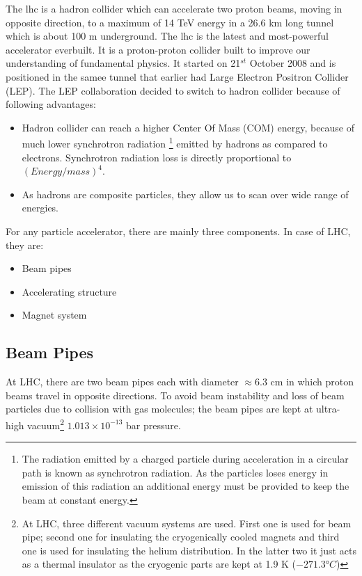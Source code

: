 The \acrshort{lhc} is  a hadron collider which can accelerate two proton beams, moving in opposite direction, to a maximum of 14 TeV energy in a 26.6 km long tunnel which is about 100 m underground. The \acrshort{lhc} is the latest and most-powerful accelerator everbuilt. It is a proton-proton collider built to improve our understanding of fundamental physics. It started on 21$^{st}$ October 2008 and is positioned in the samee tunnel that earlier had Large Electron Positron Collider (LEP). The LEP collaboration decided to switch to hadron collider because of following advantages:
\begin{itemize}
    \item Hadron collider can reach a higher Center Of Mass (COM) energy, because of much lower synchrotron radiation \footnote{The radiation emitted by a charged particle during acceleration in a circular path is known as synchrotron radiation. As the particles loses energy in emission of this radiation an additional energy must be provided to keep the beam at constant energy.} emitted by hadrons as compared to electrons. Synchrotron radiation loss is directly proportional to $(Energy/mass)^4$. 
    \item As hadrons are composite particles, they allow us to scan over wide range of energies.
\end{itemize}


For any particle accelerator, there are mainly three components. In case of LHC, they are:
\begin{itemize}
  \item Beam pipes
  \item Accelerating structure
  \item Magnet system
\end{itemize}

\subsection{Beam Pipes} %
\label{sub:beam_pipes}

At LHC, there are two beam pipes each with diameter $\approx$6.3 cm in which proton beams travel in opposite directions. To avoid beam instability and loss of beam particles due to collision with gas molecules; the beam pipes are kept at ultra-high vacuum\footnote{At LHC, three different vacuum systems are used. First one is used for beam pipe; second one for insulating the cryogenically cooled magnets and third one is used for insulating the helium distribution. In the latter two it just acts as a thermal insulator as the cryogenic parts are kept at 1.9 K ($\ang{-271.3}C$)} $1.013 \times 10^{-13}$ bar pressure.

